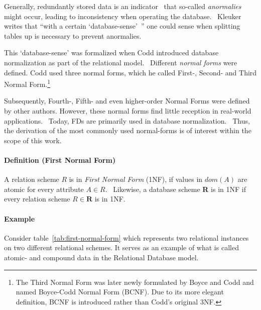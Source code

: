 Generally, redundantly stored data is an indicator~\cite[p.~61]{WAT14} that so-called \emph{anormalies} might occur, leading to inconsistency when operating the database.~\cite[p.~162]{STU16}
Kleuker writes that ``with a certain `database-sense'\ '' one could sense when splitting tables up is necessary to prevent anormalies.~\cite[p.~76]{KLE11}

This `database-sense' was formalized when Codd introduced database normalization as part of the relational model.~\cite[p.~381]{COD70}
Different \emph{normal forms} were defined.
Codd used three normal forms, which he called First-, Second- and Third Normal Form.\footnote{The Third Normal Form was later newly formulated by Boyce and Codd and named Boyce-Codd Normal Form (BCNF). Due to its more elegant definition, BCNF is introduced rather than Codd's original 3NF.}

Subsequently, Fourth-, Fifth- and even higher-order Normal Forms were defined by other authors.
However, these normal forms find little reception in real-world applications.~\cite[p.~58]{SCH17}
Today, FDs are primarily used in database normalization.~\cite[p.~1]{CAR16}
Thus, the derivation of the most commonly used normal-forms is of interest within the scope of this work.

\paragraph{Definition (First Normal Form)} A relation scheme $R$ is in \emph{First Normal Form} (1NF), if values in \(dom(A)\) are atomic for every attribute \(A \in R\).~\cite[p.~96]{MAI83}
Likewise, a database scheme \textbf{R} is in 1NF if every relation scheme \(R \in \textbf{R} \) is in 1NF.\

\paragraph{Example}Consider table~\ref{tab:first-normal-form} which represents two relational instances on two different relational schemes.
It serves as an example of what is called atomic- and compound data in the Relational Database model.~\cite[p.~6]{COD90}

